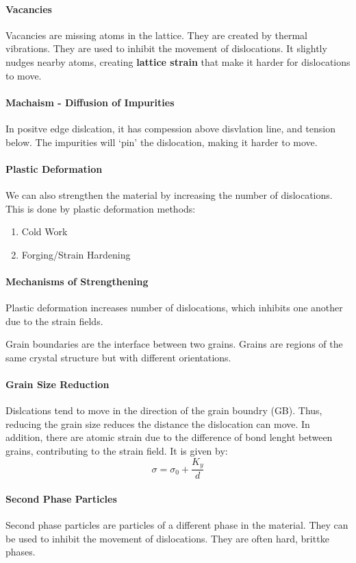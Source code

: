 \documentclass[11pt]{report}
\begin{document}
\paragraph{Vacancies} Vacancies are missing atoms in the lattice. They are created by thermal vibrations. They are used to inhibit the movement of dislocations.
It slightly nudges nearby atoms, creating \textbf{lattice strain} that make it harder for dislocations to move.
\paragraph{Machaism - Diffusion of Impurities} In positve edge dislcation, it has compession above disvlation line, and tension below. The impurities will `pin' the dislocation, making it harder to move.
\paragraph{Plastic Deformation} We can also strengthen the material by increasing the number of dislocations. This is done by plastic deformation methods:
\begin{enumerate}
    \item Cold Work
    \item Forging/Strain Hardening
\end{enumerate}
\paragraph{Mechanisms of Strengthening} Plastic deformation increases number of dislocations, which inhibits one another due to the strain fields.
\begin{definition}
    Grain boundaries are the interface between two grains. Grains are regions of the same crystal structure but with different orientations.
\end{definition}
\paragraph{Grain Size Reduction} Dislcations tend to move in the direction of the grain boundry (GB). Thus, reducing the grain size reduces the distance the dislocation can move. In addition, there are atomic strain due to the difference of bond lenght between grains, contributing to the strain field. It is given by:
\begin{equation}
    \sigma = \sigma_0 + \frac{K_y}{d}
\end{equation}
\paragraph{Second Phase Particles} Second phase particles are particles of a different phase in the material. They can be used to inhibit the movement of dislocations. They are often hard, brittke phases.
\end{document}
